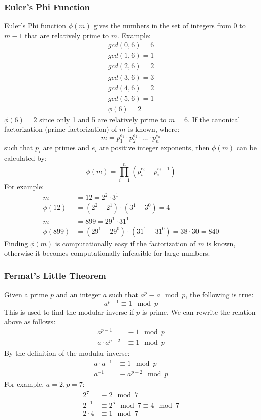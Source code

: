 \documentclass{math}
\begin{document}
\subsubsection*{Euler's Phi Function}
Euler's Phi function \( \phi(m) \) gives the numbers in the set of integers from
0 to \( m-1 \) that are relatively prime to \( m \). Example:
\begin{align*}
  gcd(0,6) = 6 \\
  gcd(1,6) = 1 \\
  gcd(2,6) = 2 \\
  gcd(3,6) = 3 \\
  gcd(4,6) = 2 \\
  gcd(5,6) = 1 \\
  \phi(6) = 2
\end{align*}
\( \phi(6) = 2 \) since only 1 and 5 are relatively prime to \( m = 6 \). If the
canonical factorization (prime factorization) of \( m \) is known, where:
\[ m = p_1^{e_1}\cdot p_2^{e_2}\cdot\dots\cdot p_n^{e_n} \]
such that \( p_i \) are primes and \( e_i \) are positive integer exponents,
then \( \phi(m) \) can be calculated by:
\[ \phi(m) = \prod_{i=1}^{n}(p_i^{e_i}-p_i^{e_i-1}) \]
For example:
\begin{align*}
  m &= 12 = 2^2\cdot3^1 \\
  \phi(12) &= (2^2-2^1)\cdot(3^1-3^0) = 4 \\
  m &= 899 = 29^1\cdot31^1 \\
  \phi(899) &= (29^1-29^0)\cdot(31^1-31^0) = 38\cdot30 = 840
\end{align*}
Finding \( \phi(m) \) is computationally easy if the factorization of \( m \) is
known, otherwise it becomes computationally infeasible for large numbers.

\subsubsection*{Fermat's Little Theorem}
Given a prime \( p \) and an integer \( a \) such that \( a^p \equiv a\mod p \),
the following is true:
\[ a^{p-1} \equiv 1\mod p \]
This is used to find the modular inverse if \( p \) is prime. We can rewrite
the relation above as follows:
\begin{align*}
  a^{p-1} &\equiv 1\mod p \\
  a\cdot a^{p-2} &\equiv 1\mod p
\end{align*}
By the definition of the modular inverse:
\begin{align*}
  a\cdot a^{-1} &\equiv 1\mod p \\
  a^{-1} &\equiv a^{p-2}\mod p
\end{align*}
For example, \( a = 2, p = 7 \):
\begin{align*}
  2^7 &\equiv 2\mod7 \\
  2^{-1} &\equiv 2^5\mod7 \equiv 4\mod7 \\
  2\cdot4 &\equiv 1\mod 7
\end{align*}
\end{document}
